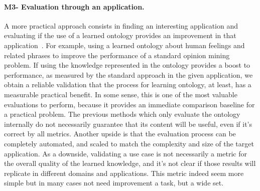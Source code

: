    \paragraph{M3- Evaluation through an application.}
    A more practical approach consists in finding an interesting application and
    evaluating if the use of a learned ontology provides an improvement in that
    application~\cite{gurevych2003semantic}. For example, using a learned ontology
    about human feelings and related phrases to improve the performance of a
    standard opinion mining problem. If using the knowledge represented in the
    ontology provides a boost to performance, as measured by the standard
    approach in the given application, we obtain a reliable validation that
    the process for learning ontology, at least, has a measurable practical benefit.
    In some sense, this is one of the most valuable evaluations to perform,
    because it provides an immediate comparison baseline for a practical problem.
    The previous methods which only evaluate the ontology internally do not
    necessarily guarantee that its content will be useful, even if it's correct by
    all metrics. Another upside is that the evaluation process can be completely
    automated, and scaled to match the complexity and size of the target application.
    As a downside, validating a use case is not necessarily a metric for the overall
    quality of the learned knowledge, and it's not clear if those results will
    replicate in different domains and applications.
    This metric indeed seem more simple but in many cases not need
    improvement a task, but a wide set.

